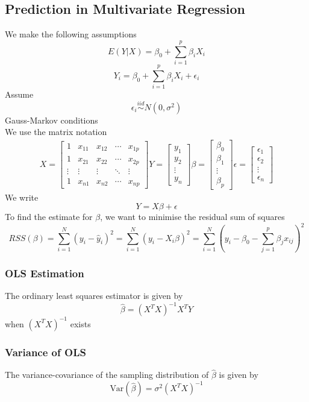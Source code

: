 \documentclass[11pt]{article}
\begin{document}
\subsection{Prediction in Multivariate Regression}
We make the following assumptions
\[E(Y|X)=\beta_0+\sum_{i=1}^{p}\beta_iX_i\]
\[Y_i=\beta_0+\sum_{i=1}^{p}\beta_iX_i+\epsilon_i\]
Assume 
\[\epsilon_i\overset{iid}{\sim}N(0,\sigma^2)\]
Gauss-Markov conditions \\
We use the matrix notation
\begin{align*}
    X = \begin{bmatrix}
        1 & x_{11} & x_{12} & \cdots & x_{1p} \\
        1 & x_{21} & x_{22} & \cdots & x_{2p} \\
        \vdots & \vdots & \vdots & \ddots & \vdots \\
        1 & x_{n1} & x_{n2} & \cdots & x_{np}
    \end{bmatrix} 
    Y = \begin{bmatrix}
        y_1 \\
        y_2 \\
        \vdots \\
        y_n 
    \end{bmatrix} 
    \beta = \begin{bmatrix}
        \beta_0 \\
        \beta_1 \\
        \vdots \\
        \beta_p
    \end{bmatrix} 
    \epsilon = \begin{bmatrix}
        \epsilon_1 \\
        \epsilon_2 \\
        \vdots \\
        \epsilon_n     
    \end{bmatrix}
\end{align*}
We write \[Y=X\beta+\epsilon\]
To find the estimate for $\beta$, we want to minimise the residual sum of squares 
\[RSS(\beta) = \sum_{i=1}^{N}(y_i - \hat{y}_i)^2 = \sum_{i=1}^{N}(y_i - X_i\beta)^2 = \sum_{i=1}^{N}(y_i - \beta_0 - \sum_{j=1}^{p}\beta_jx_{ij})^2\]
\subsubsection{OLS Estimation}
The ordinary least squares estimator is given by
\[\hat{\beta} = (X^TX)^{-1}X^TY\]
when $(X^TX)^{-1}$ exists 
\subsubsection{Variance of OLS}
The variance-covariance of the sampling distribution of $\hat{\beta}$ is given by
\[\text{Var}(\hat{\beta}) = \sigma^2(X^TX)^{-1}\]
\end{document}
